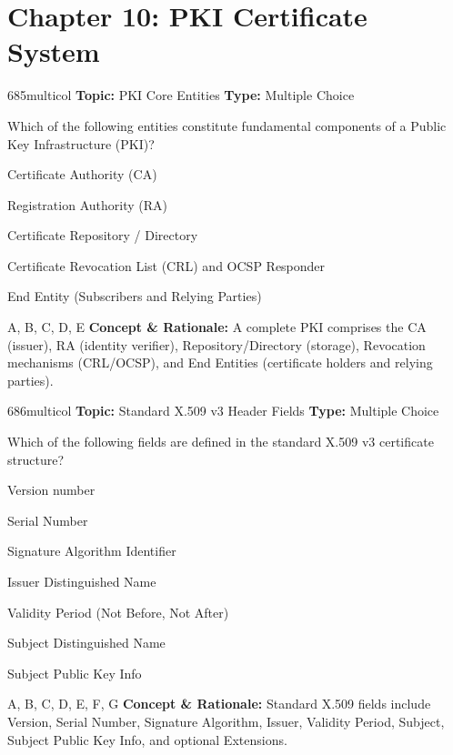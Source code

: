 \section{Chapter 10: PKI Certificate System}

\begin{qcard}{685}{multicol}
\textcolor{darkslate!75}{\small\textbf{Topic:} PKI Core Entities \hfill \textbf{Type:} Multiple Choice}\vspace{0.4em}\par
Which of the following entities constitute fundamental components of a Public Key Infrastructure (PKI)?
\begin{qoptions}
\item Certificate Authority (CA)
\item Registration Authority (RA)
\item Certificate Repository / Directory
\item Certificate Revocation List (CRL) and OCSP Responder
\item End Entity (Subscribers and Relying Parties)
\end{qoptions}
\end{qcard}
\nopagebreak
\begin{explainbox}{A, B, C, D, E}
\textbf{Concept \& Rationale:} A complete PKI comprises the CA (issuer), RA (identity verifier), Repository/Directory (storage), Revocation mechanisms (CRL/OCSP), and End Entities (certificate holders and relying parties).
\end{explainbox}

\begin{qcard}{686}{multicol}
\textcolor{darkslate!75}{\small\textbf{Topic:} Standard X.509 v3 Header Fields \hfill \textbf{Type:} Multiple Choice}\vspace{0.4em}\par
Which of the following fields are defined in the standard X.509 v3 certificate structure?
\begin{qoptions}
\item Version number
\item Serial Number
\item Signature Algorithm Identifier
\item Issuer Distinguished Name
\item Validity Period (Not Before, Not After)
\item Subject Distinguished Name
\item Subject Public Key Info
\end{qoptions}
\end{qcard}
\nopagebreak
\begin{explainbox}{A, B, C, D, E, F, G}
\textbf{Concept \& Rationale:} Standard X.509 fields include Version, Serial Number, Signature Algorithm, Issuer, Validity Period, Subject, Subject Public Key Info, and optional Extensions.
\end{explainbox}

